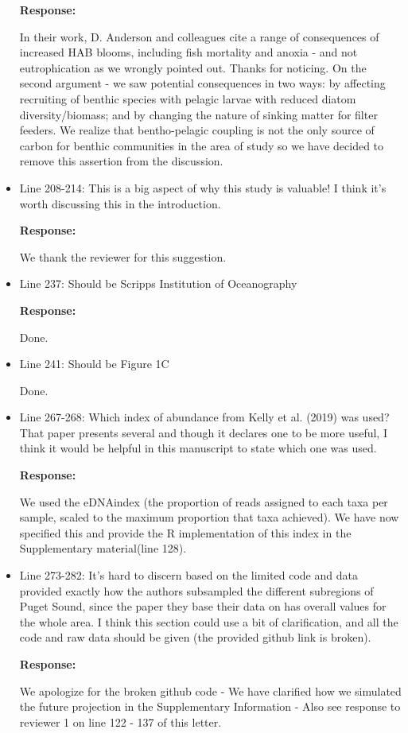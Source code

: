 \documentclass[11pt]{article}
\begin{document}
\begin{linenumbers}
\begin{itemize}
\textbf{Response:}

 In their work, D. Anderson and colleagues cite a range of consequences of increased HAB blooms, including fish mortality and anoxia - and not eutrophication as we wrongly pointed out. Thanks for noticing. On the second argument - we saw potential consequences in two ways: by affecting recruiting of benthic species with pelagic larvae with reduced diatom diversity/biomass; and by changing the nature of sinking matter for filter feeders. We realize that bentho-pelagic coupling is not the only source of carbon for benthic communities in the area of study so we have decided to remove this assertion from the discussion.


\item{Line 208-214: This is a big aspect of why this study is valuable! I think it's worth discussing this in the introduction.}

\textbf{Response:}

 We thank the reviewer for this suggestion.


\item{Line 237: Should be Scripps Institution of Oceanography}

\textbf{Response:}

 Done.


\item{Line 241: Should be Figure 1C}

Done.
 


\item{Line 267-268: Which index of abundance from Kelly et al. (2019) was used? That paper presents several and though it declares one to be more useful, I think it would be helpful in this manuscript to state which one was used.}

\textbf{Response:}

We used the eDNAindex (the proportion of reads assigned to each taxa per sample, scaled to the maximum proportion that taxa achieved). We have now specified this and provide the R implementation of this index in the Supplementary material(line 128).


\item{Line 273-282: It's hard to discern based on the limited code and data provided exactly how the authors subsampled the different subregions of Puget Sound, since the paper they base their data on has overall values for the whole area. I think this section could use a bit of clarification, and all the code and raw data should be given (the provided github link is broken).}

\textbf{Response:}

We apologize for the broken github code - We have clarified how we simulated the future projection in the Supplementary Information - Also see response to reviewer 1 on line 122 - 137 of this letter. 


\end{itemize}
 \end{linenumbers}
\end{document}
